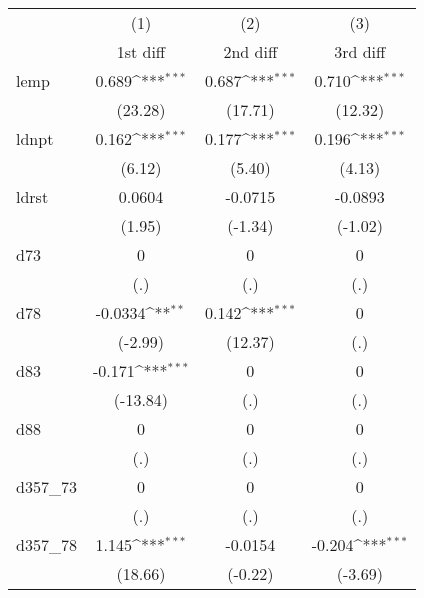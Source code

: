 {
\def\sym#1{\ifmmode^{#1}\else\(^{#1}\)\fi}
\begin{tabular}{l*{3}{c}}
\hline\hline
            &\multicolumn{1}{c}{(1)}&\multicolumn{1}{c}{(2)}&\multicolumn{1}{c}{(3)}\\
            &\multicolumn{1}{c}{1st diff}&\multicolumn{1}{c}{2nd diff}&\multicolumn{1}{c}{3rd diff}\\
\hline
lemp        &       0.689\sym{***}&       0.687\sym{***}&       0.710\sym{***}\\
            &     (23.28)         &     (17.71)         &     (12.32)         \\
[1em]
ldnpt       &       0.162\sym{***}&       0.177\sym{***}&       0.196\sym{***}\\
            &      (6.12)         &      (5.40)         &      (4.13)         \\
[1em]
ldrst       &      0.0604         &     -0.0715         &     -0.0893         \\
            &      (1.95)         &     (-1.34)         &     (-1.02)         \\
[1em]
d73         &           0         &           0         &           0         \\
            &         (.)         &         (.)         &         (.)         \\
[1em]
d78         &     -0.0334\sym{**} &       0.142\sym{***}&           0         \\
            &     (-2.99)         &     (12.37)         &         (.)         \\
[1em]
d83         &      -0.171\sym{***}&           0         &           0         \\
            &    (-13.84)         &         (.)         &         (.)         \\
[1em]
d88         &           0         &           0         &           0         \\
            &         (.)         &         (.)         &         (.)         \\
[1em]
d357\_73     &           0         &           0         &           0         \\
            &         (.)         &         (.)         &         (.)         \\
[1em]
d357\_78     &       1.145\sym{***}&     -0.0154         &      -0.204\sym{***}\\
            &     (18.66)         &     (-0.22)         &     (-3.69)         \\

\end{tabular}}
